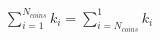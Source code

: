 \documentclass{article}
\begin{document}
\noindent$ \sum_{i=1}^{N_{coins}} k_i = \sum_{i=N_{coins}}^{1} k_i  $
\end{document}

